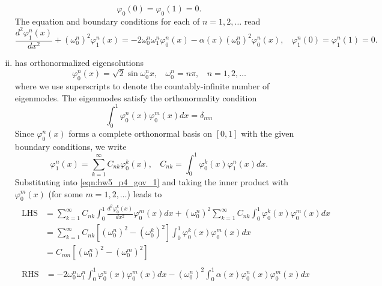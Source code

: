 \begin{enumerate}[(i)]
{\begin{equation}
        \varphi_0(0) = \varphi_0(1) = 0.
    \end{equation}
    The \order{\varepsilon} equation and boundary conditions for each of $n = 1, 2, \ldots$ read
    \begin{equation}\label{eqn:hw5_p4_gov_1}
        \frac{d^2 \varphi_1^n(x)}{dx^2} + {(\omega_0^n)}^2 \varphi_1^n(x) = -2\omega_0^n \omega_1^n \varphi_0^n(x) - \alpha(x) {(\omega_0^n)}^2 \varphi_0^n(x), ~~~~ \varphi_1^n(0) = \varphi_1^n(1) = 0.
    \end{equation}
}
\item { %
     has orthonormalized eigensolutions 
    \begin{equation}
        \varphi_0^{n}(x) = \sqrt{2} \sin\omega_0^{n} x, ~~~~
        \omega_0^{n} = n\pi, ~~~~ n = 1, 2, \ldots
    \end{equation}
    where we use superscripts to denote the countably-infinite number of eigenmodes. 
    The eigenmodes satisfy the orthonormality condition
    \begin{equation}
        \int_0^1 \varphi_0^n(x) \varphi_0^m(x) dx = \delta_{nm}
    \end{equation}
    Since $\varphi_0^n(x)$ forms a complete orthonormal basis on $[0, 1]$ with the given boundary conditions, we write 
    \begin{equation}
        \varphi_1^n(x) = \sum_{k=1}^\infty C_{nk} \varphi_0^k(x), ~~~~ C_{nk} = \int_0^1 \varphi_0^k(x) \varphi_1^n(x) dx.
    \end{equation}
    Substituting into \cref{eqn:hw5_p4_gov_1} and taking the inner product with $\varphi_0^m(x)$ (for some $m=1,2,\ldots$) leads to 
    \begin{subequations}
    \begin{align}
    \begin{split}
        \textrm{LHS} &= \sum_{k=1}^\infty C_{nk} \int_0^1 \frac{d^2 \varphi_0^k(x)}{dx^2} \varphi_0^m(x) dx + {(\omega_0^n)}^2 \sum_{k=1}^\infty C_{nk} \int_0^1 \varphi_0^k(x) \varphi_0^m(x) dx \\
        &= \sum_{k=1}^\infty C_{nk} \left[{(\omega_0^n)}^2 - {(\omega_0^k)}^2 \right] \int_0^1 \varphi_0^k(x) \varphi_0^m(x) dx \\
        &= C_{nm} \left[{(\omega_0^n)}^2 - {(\omega_0^m)}^2 \right]
    \end{split} \\
    \begin{split}
        \textrm{RHS} &= -2\omega_0^n \omega_1^n \int_0^1 \varphi_0^n(x) \varphi_0^m(x) dx - {(\omega_0^n)}^2 \int_0^1 \alpha(x) \varphi_0^n(x) \varphi_0^m(x) dx \\

\end{split}
\end{align}
\end{subequations}}
\end{enumerate}
